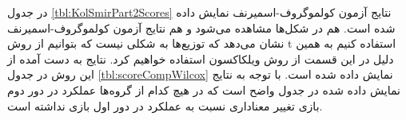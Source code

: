 \documentclass[twoside, a4paper,11pt]{book}
\numberwithin{equation}{chapter}
\numberwithin{table}{chapter}
\numberwithin{figure}{chapter}
\numberwithin{equation}{chapter}
\begin{document}
در جدول \ref{tbl:KolSmirPart2Scores} نتایج آزمون کولموگروف-اسمیرنف نمایش داده شده است. هم در شکل‌ها مشاهده می‌شود و هم نتایج آزمون کولموگروف-اسمیرنف نشان می‌دهد که توزیع‌ها به شکلی نیست که بتوانیم از روش t استفاده کنیم به همین دلیل در این قسمت از روش ویلکاکسون استفاده خواهیم کرد. نتایج به دست آمده از این روش در جدول \ref{tbl:scoreCompWilcox} نمایش داده شده است. با توجه به نتایج نمایش داده شده در جدول واضح است که در هیچ کدام از گروه‌ها عملکرد در دور دوم بازی تغییر معناداری نسبت به عملکرد در دور اول بازی نداشته است.

\begin{table}[]
\end{table}
\end{document}
